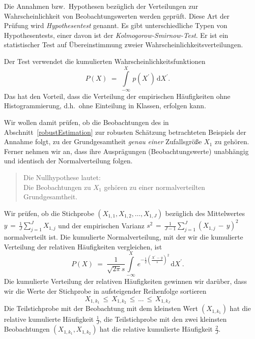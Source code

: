 Die Annahmen bzw.\ Hypothesen bezüglich der Verteilungen zur Wahrscheinlichkeit
von Beobachtungswerten werden geprüft. Diese Art der Prüfung wird \textsl{Hypothesentest}
genannt. Es gibt unterschiedliche Typen von Hypothesentests, einer davon ist 
der \textsl{Kolmogorow-Smirnow-Test}.
Er ist ein statistischer Test auf Übereinstimmung zweier Wahrscheinlichkeitsverteilungen.

Der Test verwendet die kumulierten Wahrscheinlichkeitsfunktionen
\begin{equation}
P(X) \; = \; \int\limits_{-\infty}^X \, p(X^\prime) \, \mathrm{d} X^\prime .
\end{equation}
Das hat den Vorteil, dass
die Verteilung der empirischen Häufigkeiten ohne Histogrammierung, d.h.\ ohne Einteilung in Klassen,
erfolgen kann.

Wir wollen damit prüfen, ob die Beobachtungen des in Abschnitt~\ref{robustEstimation} zur robusten
Schätzung betrachteten Beispiels der Annahme folgt, zu der Grundgesamtheit \textsl{genau einer}
Zufallsgröße $X_1$ zu gehören. Ferner nehmen wir an, dass ihre Ausprägungen (Beobachtungswerte)
unabhängig und identisch der Normalverteilung folgen.
\begin{quote}
Die Nullhypothese lautet:\\
Die Beobachtungen zu $X_1$ gehören zu einer
normalverteilten Grundgesamtheit.
\end{quote}
Wir prüfen, ob die Stichprobe $(X_{1,1}, X_{1,2}, \dots, X_{1,J})$ bezüglich
des Mittelwertes $y \, = \, \frac{1}{J} \sum_{j=1}^J X_{1,j}$ und der
empirischen Varianz $s^2 \, = \, \frac{1}{J-1} \sum_{j=1}^J (X_{1,j} \, - \, y)^2$ normalverteilt
ist. Die kumulierte Normalverteilung, mit der wir die kumulierte Verteilung der relativen Häufigkeiten
vergleichen, ist
\begin{equation}
P(X) \; = \;  \frac{1}{\sqrt{2\pi} s} 
\int\limits_{-\infty}^X \, e^{-\frac{1}{2}\left(\frac{X^\prime \, - \, y}{s}\right)^2} \, \mathrm{d} X^\prime .
\label{cdfKS}
\end{equation}
Die kumulierte Verteilung der relativen Häufigkeiten gewinnen wir darüber, dass wir die Werte der
Stichprobe in aufsteigender Reihenfolge sortieren
\begin{equation}
X_{1,k_1} \, \leq \, X_{1,k_2} \, \leq \,  \dots \, \leq \,  X_{1,k_J}
\end{equation}
Die Teilstichprobe mit der Beobachtung mit dem kleinsten Wert $(X_{1,k_1})$ hat die
relative kumulierte Häufigkeit $\frac{1}{J}$, die Teilstichprobe mit den zwei
kleinsten Beobachtungen $(X_{1,k_1}, X_{1,k_2})$ hat die relative kumulierte Häufigkeit $\frac{2}{J}$.
